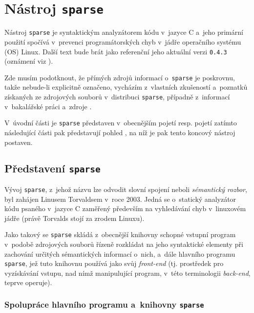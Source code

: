 \chapter{Nástroj \texttt{sparse}}
\label{chap:sparse}

Nástroj \texttt{sparse} je syntaktickým analyzátorem kódu v~jazyce C
a~jeho primární použití spočívá v~prevenci programátorských chyb v~jádře
operačního systému (OS) Linux. Další text bude brát jako referenční jeho
aktuální verzi \texttt{0.4.3} \cite{web:kernel.org:SparseDist}
(oznámení viz \cite{web:Gmane:Sparse043}).

Zde musím podotknout, že přímých zdrojů informací o~\texttt{sparse} je poskrovnu,
takže nebude-li explicitně označeno, vycházím z~vlastních zkušeností a~poznatků
získaných ze zdrojových souborů v~distribuci \texttt{sparse}, případně z~informací
v~bakalářské práci \cite{web:FITVUTBR:MartinNagy:StaticAnalysis}
a~zdroje \cite{web:Wiki:Sparse}.

V~úvodní části je \texttt{sparse} představen v~obecnějším pojetí resp. pojetí
 zatímto následující části pak představují pohled
, na níž je pak tento koncový nástroj postaven.


\section{Představení \texttt{sparse}}
\label{sec:jako-nastroj}

Vývoj \texttt{sparse}, z~jehož názvu lze odvodit slovní spojení
 neboli \emph{sémantický rozbor}, byl zahájen
Linusem Torvaldsem v~roce 2003. Jedná se o~statický analyzátor
kódu psaného v~jazyce C zaměřený především na vyhledávání chyb
v~linuxovém jádře (právě Torvalds stojí za zrodem Linuxu).

Jako takový se \texttt{sparse} skládá z~obecnější knihovny schopné vstupní program
v~podobě zdrojových souborů řízeně rozkládat na jeho syntaktické elementy
při zachování určitých sémantických informací o~nich, a~dále hlavního programu
\texttt{sparse}, jež tuto knihovnu používá jako svůj \emph{front-end}
(tj. prostředek pro vyzískávání vstupu, nad nímž manipulující program,
v~této terminologii \emph{back-end}, teprve operuje).


\subsection{Spolupráce hlavního programu a~knihovny \texttt{sparse}}

